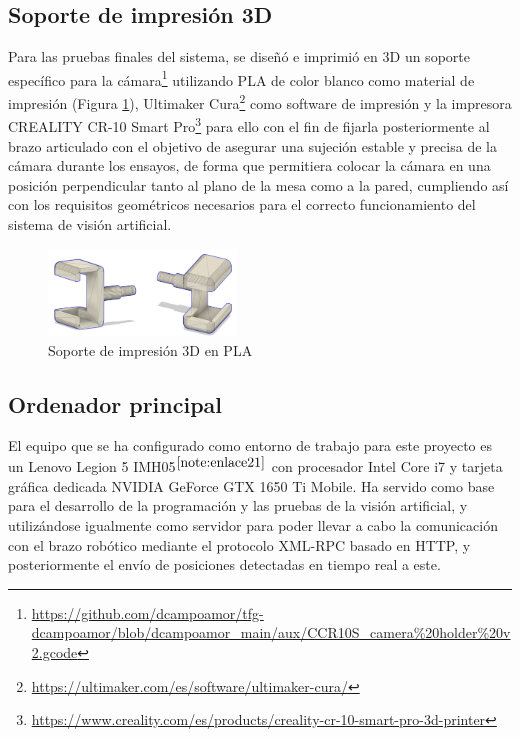 \setcounter{footnote}{17} 

\subsection{Soporte de impresión 3D}
\label{subsec:soporte_camara_PLA}

Para las pruebas finales del sistema, se diseñó e imprimió en 3D un soporte específico para la cámara\footnote{\url{https://github.com/dcampoamor/tfg-dcampoamor/blob/dcampoamor_main/aux/CCR10S_camera\%20holder\%20v2.gcode}} utilizando PLA de color blanco como material de impresión (Figura \ref{fig:soporte_camara_3D}), Ultimaker Cura\footnote{\url{https://ultimaker.com/es/software/ultimaker-cura/}} como software de impresión y la impresora CREALITY CR-10 Smart Pro\footnote{\url{https://www.creality.com/es/products/creality-cr-10-smart-pro-3d-printer}} para ello con el fin de fijarla posteriormente al brazo articulado con el objetivo de asegurar una sujeción estable y precisa de la cámara durante los ensayos, de forma que permitiera colocar la cámara en una posición perpendicular tanto al plano de la mesa como a la pared, cumpliendo así con los requisitos geométricos necesarios para el correcto funcionamiento del sistema de visión artificial.

\begin{figure} [H]
    \begin{center}
      \includegraphics[width=5cm]{figs/Vistas del soporte de la camara.png}
    \end{center}
    \caption{Soporte de impresión 3D en PLA}
    \label{fig:soporte_camara_3D}
\end{figure}


\subsection{Ordenador principal}
\label{subsec:ordenador}

El equipo que se ha configurado como entorno de trabajo para este proyecto es un Lenovo Legion 5 IMH05$^{\ref{note:enlace21}}$ con procesador Intel Core i7 y tarjeta gráfica dedicada NVIDIA GeForce GTX 1650 Ti Mobile. %
Ha servido como base para el desarrollo de la programación y las pruebas de la visión artificial, y utilizándose igualmente como servidor para poder llevar a cabo la comunicación con el brazo robótico mediante el protocolo XML-RPC basado en HTTP, y posteriormente el envío de posiciones detectadas en tiempo real a este. 

